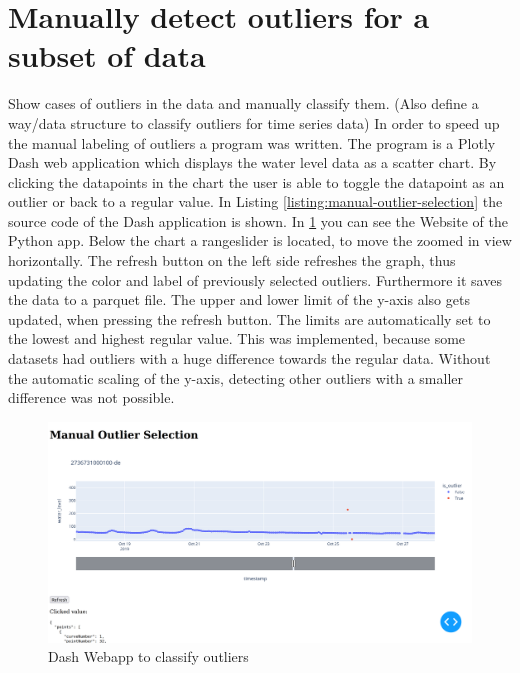 \section{Manually detect outliers for a subset of data}
Show cases of outliers in the data and manually classify them. (Also define a way/data structure to classify outliers for time series data) 
\newline
\newline
In order to speed up the manual labeling of outliers a program was written. The program is a Plotly  Dash web application which displays the water level data as a scatter chart. 
By clicking the datapoints in the chart the user is able to toggle the datapoint as an outlier or back to a regular value. 
In Listing \ref{listing:manual-outlier-selection} the source code of the Dash application is shown. 
In \ref{figure:manual-outlier-selection} you can see the Website of the Python app. Below the chart a rangeslider is located, to move the zoomed in view horizontally. 
The refresh button on the left side refreshes the graph, thus updating the color and label of previously selected outliers. Furthermore it saves the data to a parquet file.
The upper and lower limit of the y-axis also gets updated, when pressing the refresh button. 
The limits are automatically set to the lowest and highest regular value. 
This was implemented, because some datasets had outliers with a huge difference towards the regular data. 
Without the automatic scaling of the y-axis, detecting other outliers with a smaller difference was not possible.
\begin{figure}[H]
    \centering
    \includegraphics[width=\textwidth]{./pics/manual-outlier-selection.png}
    \caption{Dash Webapp to classify outliers}
    \label{figure:manual-outlier-selection}
\end{figure}


